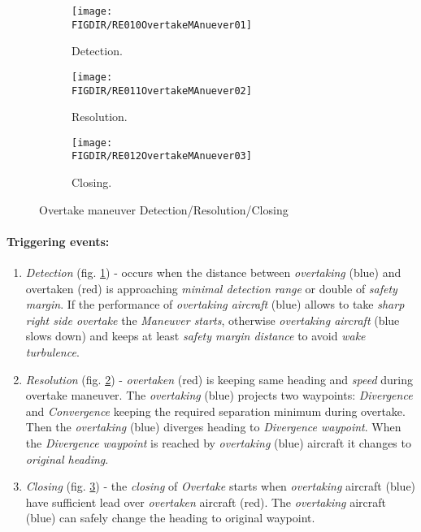 \begin{figure}[H]
	\centering
    \begin{subfigure}{0.32\textwidth}
        \texttt{[image: \\FIGDIR/RE010OvertakeMAnuever01]} 
        \caption{Detection.}
        \label{fig:OvertakeManeuverTheoreticalDetection}
    \end{subfigure}
    \begin{subfigure}{0.32\textwidth}
        \texttt{[image: \\FIGDIR/RE011OvertakeMAnuever02]} 
        \caption{Resolution.}
        \label{fig:OvertakeManeuverTheoreticalResolution}
    \end{subfigure}
    \begin{subfigure}{0.32\textwidth}
        \texttt{[image: \\FIGDIR/RE012OvertakeMAnuever03]} 
        \caption{Closing.}
        \label{fig:OvertakeManeuverTheoreticalClosure}
    \end{subfigure}
    \caption{Overtake maneuver Detection/Resolution/Closing}
    \label{fig:OvertakeManeuverTheoretical}
\end{figure}

\paragraph{Triggering events:}
\begin{enumerate}
    \item \emph{Detection} (fig. \ref{fig:OvertakeManeuverTheoreticalDetection}) - occurs when the distance between \emph{overtaking} (blue) and overtaken (red) is approaching \emph{minimal detection range} or double of \emph{safety margin}. If the performance of \emph{overtaking aircraft} (blue) allows to take \emph{sharp right side overtake} the \emph{Maneuver starts}, otherwise \emph{overtaking aircraft} (blue slows down) and keeps at least \emph{safety margin distance} to avoid \emph{wake turbulence}.
    
    \item \emph{Resolution} (fig. \ref{fig:OvertakeManeuverTheoreticalResolution}) - \emph{overtaken} (red) is keeping same heading and \emph{speed} during overtake maneuver. The \emph{overtaking} (blue) projects two waypoints: \emph{Divergence} and \emph{Convergence} keeping the required separation minimum during overtake. Then the \emph{overtaking} (blue) diverges heading to \emph{Divergence waypoint}. When the \emph{Divergence waypoint} is reached by \emph{overtaking} (blue) aircraft it changes to \emph{original heading}.
    
    \item \emph{Closing} (fig. \ref{fig:OvertakeManeuverTheoreticalClosure}) - the \emph{closing} of \emph{Overtake} starts when \emph{overtaking} aircraft (blue) have sufficient lead over \emph{overtaken} aircraft (red). The \emph{overtaking} aircraft (blue) can safely change the heading to original waypoint.
\end{enumerate}


